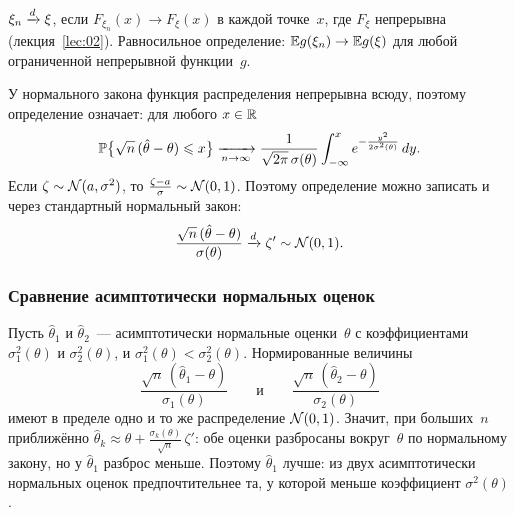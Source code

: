 \begin{reminder}
  $\xi_n \tod \xi$, если $F_{\xi_n}(x) \to F_\xi(x)$ в каждой точке~$x$, где $F_\xi$ непрерывна
  (лекция~\ref{lec:02}). Равносильное определение: $\E g(\xi_n) \to \E g(\xi)$ для любой
  ограниченной непрерывной функции~$g$.
\end{reminder}

У нормального закона функция распределения непрерывна всюду, поэтому определение
означает: для любого $x \in \R$
\[
  \P\bigl\{\sqrt{n}\,(\hat\theta - \theta) \le x\bigr\} \xrightarrow[n \to \infty]{}
  \frac{1}{\sqrt{2\pi}\,\sigma(\theta)} \int_{-\infty}^{x} e^{-\frac{y^2}{2\sigma^2(\theta)}} \, dy.
\]
Если $\zeta \sim \Norm(a, \sigma^2)$, то $\frac{\zeta - a}{\sigma} \sim \Norm(0, 1)$. Поэтому
определение можно записать и через стандартный нормальный закон:
\[
  \frac{\sqrt{n}\,(\hat\theta - \theta)}{\sigma(\theta)} \tod \zeta' \sim \Norm(0, 1).
\]

\subsubsection{Сравнение асимптотически нормальных оценок}

Пусть $\hat\theta_1$ и $\hat\theta_2$~--- асимптотически нормальные оценки~$\theta$
с коэффициентами $\sigma_1^2(\theta)$ и $\sigma_2^2(\theta)$, и $\sigma_1^2(\theta) < \sigma_2^2(\theta)$.
Нормированные величины
\[
  \frac{\sqrt{n}\,(\hat\theta_1 - \theta)}{\sigma_1(\theta)}
  \qquad\text{и}\qquad
  \frac{\sqrt{n}\,(\hat\theta_2 - \theta)}{\sigma_2(\theta)}
\]
имеют в пределе одно и то же распределение $\Norm(0, 1)$. Значит, при больших~$n$
приближённо $\hat\theta_k \approx \theta + \frac{\sigma_k(\theta)}{\sqrt{n}}\, \zeta'$:
обе оценки разбросаны вокруг~$\theta$ по нормальному закону, но у $\hat\theta_1$ разброс меньше.
Поэтому $\hat\theta_1$ лучше: из двух асимптотически нормальных оценок предпочтительнее
та, у которой меньше коэффициент $\sigma^2(\theta)$.

